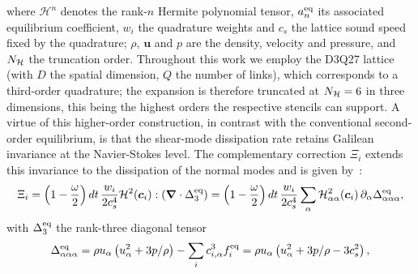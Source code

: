 where $\mathcal{H}^n$ denotes the rank-$n$ Hermite polynomial tensor, $a_n^{\rm eq}$ its associated equilibrium coefficient, $w_i$ the quadrature weights and $c_s$ the lattice sound speed fixed by the quadrature; $\rho$, $\bm{u}$ and $p$ are the density, velocity and pressure, and $\deleted{N}\added{N_\mathcal{H}}$ the truncation order. Throughout this work we employ the D3Q27 lattice (with $D$ the spatial dimension, $Q$ the number of links), which corresponds to a third-order quadrature; the expansion is therefore truncated at $\deleted{N}\added{N_\mathcal{H}}=6$ in three dimensions, this being the highest orders the respective stencils can support. A virtue of this higher-order construction, in contrast with the conventional second-order equilibrium, is that the shear-mode dissipation rate retains Galilean invariance at the Navier-Stokes level. The complementary correction $\Xi_i$ extends this invariance to the dissipation of the normal modes and is given by~\cite{hosseini2020compressibility,feng2015three}:
\begin{equation}\label{eq:correction}
    \Xi_i = \left(1-\frac{\omega}{2}\right)\added{dt\,}\frac{w_i}{2c_s^4}\deleted{\left(\bm{\nabla}\mathcal{H}^2\right):\Delta^{\rm eq}_3}\added{\mathcal{H}^2(\bm{c}_i):\left(\bm{\nabla}\cdot\Delta^{\rm eq}_3\right)
    = \left(1-\frac{\omega}{2}\right)dt\,\frac{w_i}{2c_s^4}\sum_{\alpha}\mathcal{H}^2_{\alpha\alpha}(\bm{c}_i)\,\partial_\alpha\Delta^{\rm eq}_{\alpha\alpha\alpha}},
\end{equation}
with $\Delta^{\rm eq}_3$ the rank-three diagonal tensor
\begin{equation}
    \Delta^{\rm eq}_{\alpha\alpha\alpha} = \rho u_\alpha \left(u_\alpha^2 + 3p/\rho\right) - \sum_i c_{i,\alpha}^3 f^{\rm eq}_i\added{ = \rho u_\alpha \left(u_\alpha^2 + 3p/\rho - 3c_s^2\right)},
\end{equation}
